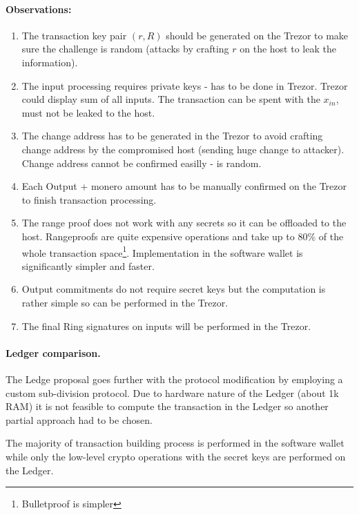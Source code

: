 \documentclass[]{article}
\begin{document}
\paragraph{Observations:}
\begin{enumerate}
	\item The transaction key pair $(r,R)$ should be generated on the Trezor to make sure the challenge is random (attacks by crafting $r$ on the host to leak the information). 
	
	\item The input processing requires private keys - has to be done in Trezor. Trezor could display sum of all inputs. The transaction can be spent with the $x_{in}$, must not be leaked to the host.
	
	\item The change address has to be generated in the Trezor to avoid crafting change address by the compromised host (sending huge change to attacker). Change address cannot be confirmed easilly - is random.
	
	\item Each Output + monero amount has to be manually confirmed on the Trezor to finish transaction processing.
	
	\item The range proof does not work with any secrets so it can be offloaded to the host. Rangeproofs are quite expensive operations and take up to 80\% of the whole transaction space\footnote{Bulletproof is simpler}. Implementation in the software wallet is significantly simpler and faster.
	
	\item Output commitments do not require secret keys but the computation is rather simple so can be performed in the Trezor.
	
	\item The final Ring signatures on inputs will be performed in the Trezor.
\end{enumerate}

\paragraph{Ledger comparison.} The Ledge proposal \cite{ledger_doc} goes further with the protocol modification by employing a custom sub-division protocol. Due to hardware nature of the Ledger (about 1k RAM) it is not feasible to compute the transaction in the Ledger so another partial approach had to be chosen.

The majority of  transaction building process is performed in the software wallet while only the low-level crypto operations with the secret keys are performed on the Ledger.  
\end{document}

